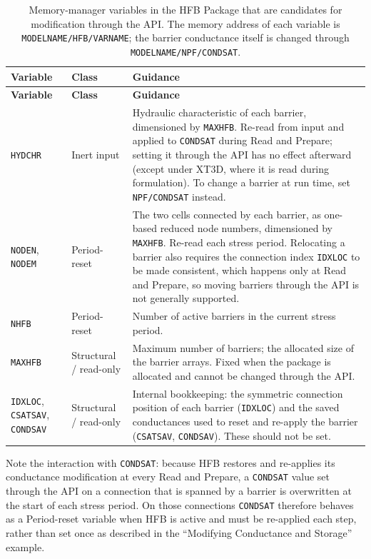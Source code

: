 \begin{longtable}{p{} p{} p{}}
\caption{Memory-manager variables in the HFB Package that are candidates for
modification through the API. The memory address of each variable is
\texttt{MODELNAME/HFB/VARNAME}; the barrier conductance itself is changed through
\texttt{MODELNAME/NPF/CONDSAT}.} \label{table:api-gwf-hfb} \\

\hline
\textbf{Variable} & \textbf{Class} & \textbf{Guidance} \\
\hline
\endfirsthead

\hline
\textbf{Variable} & \textbf{Class} & \textbf{Guidance} \\
\hline
\endhead

\texttt{HYDCHR} & Inert input &
Hydraulic characteristic of each barrier, dimensioned by \texttt{MAXHFB}. Re-read
from input and applied to \texttt{CONDSAT} during Read and Prepare; setting it
through the API has no effect afterward (except under XT3D, where it is read
during formulation). To change a barrier at run time, set \texttt{NPF/CONDSAT}
instead. \\

\texttt{NODEN}, \texttt{NODEM} & Period-reset &
The two cells connected by each barrier, as one-based reduced node numbers,
dimensioned by \texttt{MAXHFB}. Re-read each stress period. Relocating a barrier
also requires the connection index \texttt{IDXLOC} to be made consistent, which
happens only at Read and Prepare, so moving barriers through the API is not
generally supported. \\

\texttt{NHFB} & Period-reset &
Number of active barriers in the current stress period. \\

\texttt{MAXHFB} & Structural / read-only &
Maximum number of barriers; the allocated size of the barrier arrays. Fixed when
the package is allocated and cannot be changed through the API. \\

\texttt{IDXLOC}, \texttt{CSATSAV}, \texttt{CONDSAV} & Structural / read-only &
Internal bookkeeping: the symmetric connection position of each barrier
(\texttt{IDXLOC}) and the saved conductances used to reset and re-apply the
barrier (\texttt{CSATSAV}, \texttt{CONDSAV}). These should not be set. \\

\hline
\end{longtable}

\noindent Note the interaction with \texttt{CONDSAT}: because HFB restores and
re-applies its conductance modification at every Read and Prepare, a
\texttt{CONDSAT} value set through the API on a connection that is spanned by a
barrier is overwritten at the start of each stress period. On those connections
\texttt{CONDSAT} therefore behaves as a Period-reset variable when HFB is active
and must be re-applied each step, rather than set once as described in the
``Modifying Conductance and Storage'' example.
